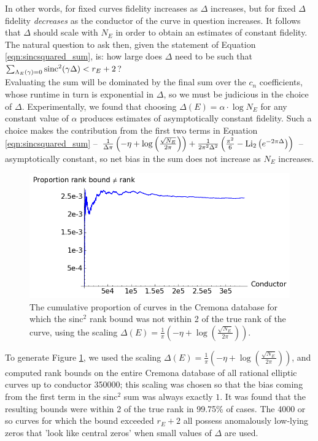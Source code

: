 In other words, for fixed curves fidelity increases as $\Delta$ increases, but for fixed $\Delta$ fidelity {\it decreases} as the conductor of the curve in question increases. It follows that $\Delta$ should scale with $N_E$ in order to obtain an estimates of constant fidelity. The natural question to ask then, given the statement of Equation \ref{eqn:sincsquared_sum}, is: how large does $\Delta$ need to be such that $\sum_{\Lambda_E(\gamma)=0}\text{sinc}^2(\gamma \Delta) < r_E+2$? \\

Evaluating the sum will be dominated by the final sum over the $c_n$ coefficients, whose runtime in turn is exponential in $\Delta$, so we must be judicious in the choice of $\Delta$. Experimentally, we found that choosing $\Delta(E) = \alpha \cdot \log N_E$ for any constant value of $\alpha$ produces estimates of asymptotically constant fidelity. Such a choice makes the contribution from the first two terms in Equation \ref{eqn:sincsquared_sum} -- $\frac{1}{\Delta \pi}\left(-\eta + \log\left(\frac{\sqrt{N_E}}{2\pi}\right)\right) + \frac{1}{2\pi^2 \Delta^2}\left(\frac{\pi^2}{6} - \text{Li}_2\left(e^{-2\pi \Delta}\right)\right)$ -- asymptotically constant, so net bias in the sum does not increase as $N_E$ increases. \\

\begin{figure}[!h]
    \centering
    \includegraphics[width=1.0\textwidth]{graphics/rkub_ne_rk.png}
    \caption{The cumulative proportion of curves in the Cremona database for which the sinc$^2$ rank bound was not within 2 of the true rank of the curve, using the scaling $\Delta(E) = \frac{1}{\pi}\left(-\eta + \log\left(\frac{\sqrt{N_E}}{2\pi}\right)\right)$. }
    \label{fig:rkub_ne_rk}
\end{figure}

To generate Figure \ref{fig:rkub_ne_rk}, we used the scaling $\Delta(E) = \frac{1}{\pi}\left(-\eta + \log\left(\frac{\sqrt{N_E}}{2\pi}\right)\right)$, and computed rank bounds on the entire Cremona database of all rational elliptic curves up to conductor 350000; this scaling was chosen so that the bias coming from the first term in the sinc$^2$ sum was always exactly $1$. It was found that the resulting bounds were within 2 of the true rank in 99.75\% of cases. The 4000 or so curves for which the bound exceeded $r_E+2$ all possess anomalously low-lying zeros that 'look like central zeros' when small values of $\Delta$ are used. \\

